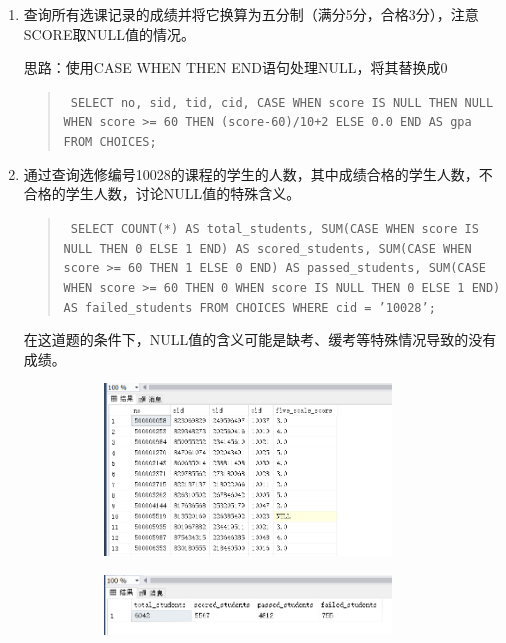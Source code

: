 \documentclass[a4paper,twoside]{article}
\begin{document}
\begin{spacing}{1.2}
\begin{enumerate}
\item 查询所有选课记录的成绩并将它换算为五分制（满分5分，合格3分），注意SCORE取NULL值的情况。

思路：使用CASE WHEN THEN END语句处理NULL，将其替换成0

\begin{quote}
\texttt{
SELECT no, sid, tid, cid,
  CASE 
    WHEN score IS NULL THEN NULL
    WHEN score >= 60 THEN (score-60)/10+2
    ELSE 0.0
  END AS gpa
FROM CHOICES;
}
\end{quote}
\item 通过查询选修编号10028的课程的学生的人数，其中成绩合格的学生人数，不合格的学生人数，讨论NULL值的特殊含义。
\begin{quote}
\texttt{
SELECT 
  COUNT(*) AS total\_students,
  SUM(CASE WHEN score IS NULL THEN 0 ELSE 1 END) AS scored\_students,
  SUM(CASE WHEN score >= 60 THEN 1 ELSE 0 END) AS passed\_students,
  SUM(CASE WHEN score >= 60 THEN 0 WHEN score IS NULL THEN 0 ELSE 1 END) AS failed\_students
FROM CHOICES
WHERE cid = '10028';
}
\end{quote}

在这道题的条件下，NULL值的含义可能是缺考、缓考等特殊情况导致的没有成绩。


\begin{figure}[h]
  \centering
  \caption{运行结果}
  \begin{subfigure}{0.3\textwidth}
    \includegraphics[width=0.9\textwidth]{fig28.png}
  \end{subfigure}
  \begin{subfigure}{0.3\textwidth}
    \includegraphics[width=0.9\textwidth]{fig29.png}
  \end{subfigure}
\end{figure}


\end{enumerate}
\end{spacing}
\end{document}
